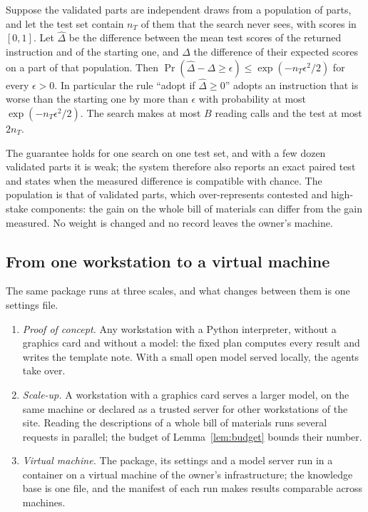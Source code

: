 \begin{lemma}\label{lem:heldout}
Suppose the validated parts are independent draws from a population of parts, and let the test set contain $n_T$ of
them that the search never sees, with scores in $[0,1]$. Let $\hat\Delta$ be the difference between the mean test
scores of the returned instruction and of the starting one, and $\Delta$ the difference of their expected scores on
a part of that population. Then $\Pr(\hat\Delta-\Delta\ge\epsilon)\le\exp(-n_T\epsilon^2/2)$ for every
$\epsilon>0$. In particular the rule ``adopt if $\hat\Delta\ge0$'' adopts an instruction that is worse than the
starting one by more than $\epsilon$ with probability at most $\exp(-n_T\epsilon^2/2)$. The search makes at most
$B$ reading calls and the test at most $2n_T$.
\end{lemma}

The guarantee holds for one search on one test set, and with a few dozen validated parts it is weak; the system
therefore also reports an exact paired test and states when the measured difference is compatible with chance. The
population is that of validated parts, which over-represents contested and high-stake components: the gain on the
whole bill of materials can differ from the gain measured.
No weight is changed and no record leaves the owner's machine.

\subsection{From one workstation to a virtual machine}\label{sec:deployment}

The same package runs at three scales, and what changes between them is one settings file.
\begin{enumerate}\setlength{\itemsep}{0pt}
\item \emph{Proof of concept.} Any workstation with a Python interpreter, without a graphics card and without a
  model: the fixed plan computes every result and writes the template note. With a small open model served
  locally, the agents take over.
\item \emph{Scale-up.} A workstation with a graphics card serves a larger model, on the same machine or declared
  as a trusted server for other workstations of the site. Reading the descriptions of a whole bill of materials
  runs several requests in parallel; the budget of Lemma~\ref{lem:budget} bounds their number.
\item \emph{Virtual machine.} The package, its settings and a model server run in a container on a virtual machine
  of the owner's infrastructure; the knowledge base is one file, and the manifest of each run makes results
  comparable across machines.
\end{enumerate}
